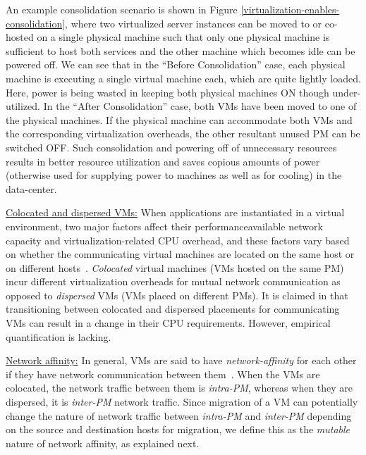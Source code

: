 An example consolidation scenario is shown in Figure \ref{virtualization-enables-consolidation}, where two virtualized server
instances can be moved to or co-hosted on a single physical machine such that
only one physical machine is sufficient to host both services and
the other machine which becomes idle can be powered off.
We can see that in the ``Before Consolidation'' case, each physical
machine is executing a single virtual machine each, which are quite
lightly loaded. Here, power is being wasted in keeping both physical
machines ON though under-utilized. In the ``After Consolidation'' case,
both VMs have been moved to one of the physical machines. 
If the physical machine can
accommodate both VMs and the corresponding virtualization overheads, 
the other resultant unused PM can be switched OFF. Such consolidation and
powering off of unnecessary resources results in better resource
utilization and saves copious amounts of power
(otherwise used for supplying power to machines as well as for cooling) in
the data-center.

\underline{Colocated and dispersed VMs:} When applications are 
instantiated in a virtual
environment, two major factors affect their performance\textemdash{}available
network capacity and virtualization-related CPU overhead,
and these factors vary based on whether the communicating virtual machines 
are located on the same host or on different hosts~\cite{virtual-putty}.
\emph{Colocated} 
virtual machines (VMs 
hosted on the same PM) incur 
different virtualization overheads for mutual network
communication as opposed to \emph{dispersed} VMs 
(VMs placed on different PMs).
It is claimed in \cite{virtual-putty} that transitioning
between colocated and dispersed placements for communicating VMs
can result in a change in their CPU requirements. However, empirical
quantification is lacking.

\underline{Network affinity:} In general, VMs are said to have
\textit{network-affinity}
for each other if they have 
network communication between them~\cite{virtual-putty, starling}.
When the VMs are colocated, the network traffic between them
is \textit{intra-PM}, whereas when they are dispersed,
it is \textit{inter-PM} network traffic.
Since migration of a VM can potentially change the nature of network
traffic between \textit{intra-PM} and \textit{inter-PM} depending 
on the source and destination hosts for migration, we define this
as the \textit{mutable} nature of network affinity, as explained next.


